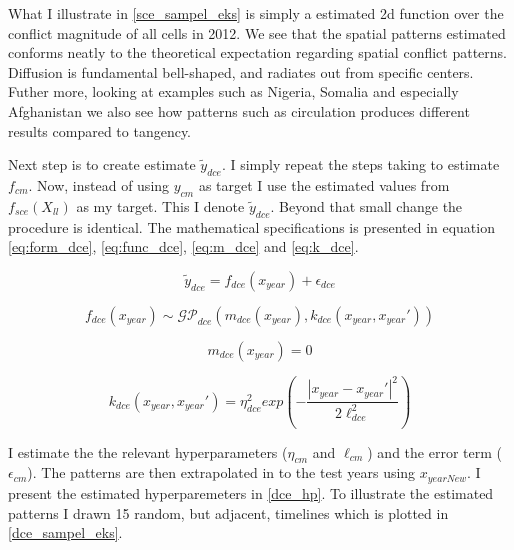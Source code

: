 \documentclass[a4paper]{article}
\begin{document}
What I illustrate in \autoref{sce_sampel_eks} is simply a estimated 2d function over the conflict magnitude of all cells in 2012. We see that the spatial patterns estimated conforms neatly to the theoretical expectation regarding spatial conflict patterns. Diffusion is fundamental bell-shaped, and radiates out from specific centers. Futher more, looking at examples such as Nigeria, Somalia and especially Afghanistan we also see how patterns such as circulation produces different results compared to tangency.\par  

Next step is to create estimate $\tilde{y}_{dce}$. I simply repeat the steps taking to estimate $f_{cm}$. Now, instead of using $y_{cm}$ as target I use the estimated values from $f_{sce}(X_{ll})$ as my target. This I denote $\tilde{y}_{dce}$. Beyond that small change the procedure is identical. The mathematical specifications is presented in equation \ref{eq:form_dce}, \ref{eq:func_dce}, \ref{eq:m_dce} and \ref{eq:k_dce}.\par 


\[
\tilde{y}_{dce} = f_{dce}(x_{year}) + \epsilon_{dce} \tag{27} \label{eq:form_dce}
\]

\[
f_{dce}(x_{year}) \sim \mathcal{GP}_{dce}(m_{dce}(x_{year}),k_{dce}(x_{year},x_{year}')) \tag{28} \label{eq:func_dce}
\]

\[
m_{dce}(x_{year}) = 0 \tag{21} \label{eq:m_dce}
\]

\[
k_{dce}(x_{year},x_{year}') = \eta_{dce}^2 exp\left(-\frac{|x_{year}-x_{year}'|^2}{2\ell_{dce}^2}\right) \tag{29} \label{eq:k_dce}
\]

I estimate the the relevant hyperparameters ($\eta_{cm}$ and $\ell_{cm}$) and the error term ($\epsilon_{cm}$). The patterns are then extrapolated in to the test years using $x_{yearNew}$. I present the estimated hyperparemeters in \autoref{dce_hp}. To illustrate the estimated patterns I drawn 15 random, but adjacent, timelines which is plotted in \autoref{dce_sampel_eks}.\par 
\end{document}
